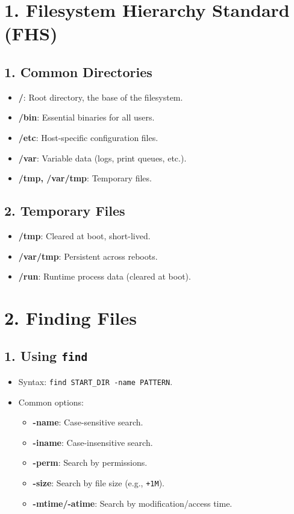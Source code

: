 \documentclass[a4paper]{report}
\begin{document}
\section*{1. Filesystem Hierarchy Standard (FHS)}

\subsection*{1. Common Directories}
\begin{itemize}
    \item \textbf{/}: Root directory, the base of the filesystem.
    \item \textbf{/bin}: Essential binaries for all users.
    \item \textbf{/etc}: Host-specific configuration files.
    \item \textbf{/var}: Variable data (logs, print queues, etc.).
    \item \textbf{/tmp, /var/tmp}: Temporary files.
\end{itemize}

\subsection*{2. Temporary Files}
\begin{itemize}
    \item \textbf{/tmp}: Cleared at boot, short-lived.
    \item \textbf{/var/tmp}: Persistent across reboots.
    \item \textbf{/run}: Runtime process data (cleared at boot).
\end{itemize}

\section*{2. Finding Files}

\subsection*{1. Using \texttt{find}}
\begin{itemize}
    \item Syntax: \texttt{find START\_DIR -name PATTERN}.
    \item Common options:
    \begin{itemize}
        \item \textbf{-name}: Case-sensitive search.
        \item \textbf{-iname}: Case-insensitive search.
        \item \textbf{-perm}: Search by permissions.
        \item \textbf{-size}: Search by file size (e.g., \texttt{+1M}).
        \item \textbf{-mtime/-atime}: Search by modification/access time.
    \end{itemize}
\end{itemize}
\end{document}
